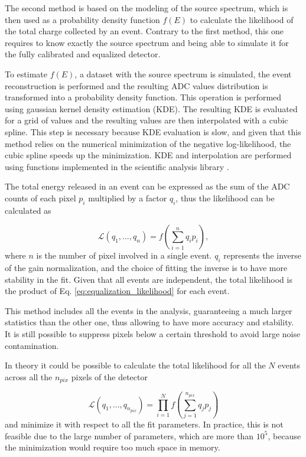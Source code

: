 The second method is based on the modeling of the source spectrum, which is then used as a probability density function $f(E)$ to calculate the likelihood of the total charge collected by an event. Contrary to the first method, this one requires to know exactly the source spectrum and being able to simulate it for the fully calibrated and equalized detector.

To estimate $f(E)$, a dataset with the source spectrum is simulated, the event reconstruction is performed and the resulting ADC values distribution is transformed into a probability density function. This operation is performed using gaussian kernel density estimation (KDE). The resulting KDE is evaluated for a grid of values and the resulting values are then interpolated with a cubic spline. This step is necessary because KDE evaluation is slow, and given that this method relies on the numerical minimization of the negative log-likelihood, the cubic spline speeds up the minimization. KDE and interpolation are performed using functions implemented in the scientific analysis library \cite{scipy2020}.

The total energy released in an event can be expressed as the sum of the ADC counts of each pixel $p_i$ multiplied by a factor $q_i$, thus the likelihood can be calculated as

\begin{equation}
\mathcal{L}(q_1, ..., q_n) = f \left( \sum_{i=1}^n q_i p_i \right),
\label{eq:equalization_likelihood}
\end{equation}
where $n$ is the number of pixel involved in a single event. $q_i$ represents the inverse of the gain normalization, and the choice of fitting the inverse is to have more stability in the fit. Given that all events are independent, the total likelihood is the product of Eq. \ref{eq:equalization_likelihood} for each event.

This method includes all the events in the analysis, guaranteeing a much larger statistics than the other one, thus allowing to have more accuracy and stability. It is still possible to suppress pixels below a certain threshold to avoid large noise contamination.

In theory it could be possible to calculate the total likelihood for all the $N$ events across all the $n_{pix}$ pixels of the detector

\begin{equation}
\mathcal{L}(q_1, ..., q_{n_{pix}}) = \prod_{i=1}^{N} f \left( \sum_{j=1}^{n_{pix}} q_j p_j \right)
\label{eq:total_likelihood}
\end{equation}
and minimize it with respect to all the fit parameters. In practice, this is not feasible due to the large number of parameters, which are more than $10^5$, because the minimization would require too much space in memory.

